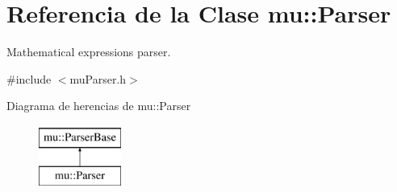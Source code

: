 \hypertarget{classmu_1_1_parser}{}\section{Referencia de la Clase mu\+:\+:Parser}
\label{classmu_1_1_parser}


Mathematical expressions parser.  




{\ttfamily \#include $<$mu\+Parser.\+h$>$}

Diagrama de herencias de mu\+:\+:Parser\begin{figure}[H]
\begin{center}
\leavevmode
\includegraphics[height=2.000000cm]{classmu_1_1_parser}
\end{center}
\end{figure}
